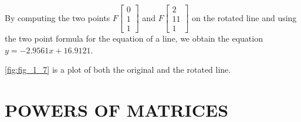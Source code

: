 \documentclass[../main.tex]{subfiles}
\begin{document}
\begin{example}
By computing the two points $F\left[\begin{array}{l}0 \\ 1 \\ 1\end{array}\right]$ and $F\left[\begin{array}{c}2 \\ 11 \\ 1\end{array}\right]$ on the rotated line and using the two point formula for the equation of a line, we obtain the equation $y=-2.9561 x+16.9121$.

\autoref{fig:fig_1_7} is a plot of both the original and the rotated line.
\end{example}

\section[Power of Matrices]{POWERS OF MATRICES}
\label{sec:sec_1_3}
\end{document}
